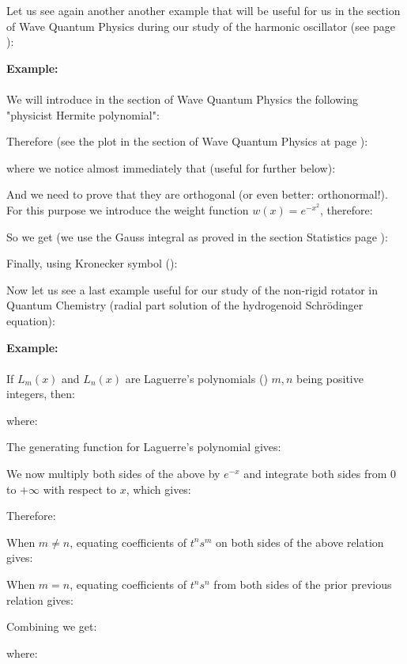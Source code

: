 	\pagebreak
	Let us see again another another example that will be useful for us in the section of Wave Quantum Physics during our study of the harmonic oscillator (see page \pageref{Hermite polynomials}):
	\begin{tcolorbox}[colframe=black,colback=white,sharp corners,breakable]
	\textbf{{\Large {}}Example:}\\\\
	We will introduce in the section of Wave Quantum Physics the following "physicist Hermite polynomial\label{hermite polynomial}":
	
	Therefore (see the plot in the section of Wave Quantum Physics at page \pageref{Hermite polynomials}):
	
	where we notice almost immediately that (useful for further below):
	
	And we need to prove that they are orthogonal (or even better: orthonormal!).\\
	
	For this purpose we introduce the weight function $w(x)=e^{-x^2}$, therefore:
	
	So we get (we use the Gauss integral as proved in the section Statistics page \pageref{Gauss integral}):
	
	Finally, using Kronecker symbol ():
	
	\end{tcolorbox}
	
	\label{orthogonality of Laguerre polynomial}
	Now let us see a last example useful for our study of the non-rigid rotator in Quantum Chemistry (radial part solution of the hydrogenoid Schrödinger equation):
	\begin{tcolorbox}[colframe=black,colback=white,sharp corners,breakable]
	\textbf{{\Large {}}Example:}\\\\
	If $L_{m}(x)$ and $L_{n}(x)$ are Laguerre's polynomials () $m,n$ being positive integers, then:
	
	where:
	
	The generating function for Laguerre's polynomial gives:
	
	We now multiply both sides of the above by $e^{-x}$ and integrate both sides from $0$ to $+\infty$ with respect to $x$, which gives:
	
	Therefore:
	
	When $m\neq n$, equating coefficients of $t^{n} s^{m}$ on both sides of the above relation gives:
	
	When $m=n$, equating coefficients of $t^{n} s^{n}$ from both sides of the prior previous relation gives:
	
	Combining we get:
	
	where:
	
	\end{tcolorbox}
	
